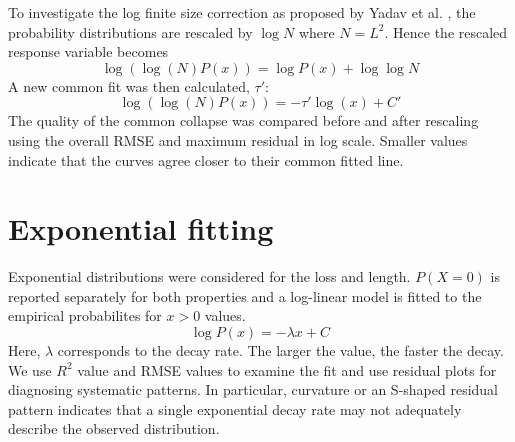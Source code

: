 To investigate the log finite size correction as proposed by Yadav et al.  \cite{Yadav2022FiniteSize}, the probability distributions are rescaled by $\log N$ where $N=L^2$. Hence the rescaled response variable becomes
\[
\log (\log (N)P(x))=\log P(x)+\log\log N
\]
A new common fit was then calculated, $\tau'$:
\[
 \log (\log (N)P(x))= -\tau' \log(x)+C'
\]
The quality of the common collapse was compared before and after
rescaling using the overall RMSE and maximum residual in log scale. Smaller values indicate that the curves agree closer to their common fitted line.

\section{Exponential fitting}\label{sec:exponential}

Exponential distributions were considered for the loss and length. $P(X=0)$ is reported separately for both properties and a log-linear model is fitted to the empirical probabilites for $x>0$ values.
\[
\log P(x) = -\lambda x +C
\]
Here, $\lambda$ corresponds to the decay rate. The larger the value, the faster the decay.\\

We use $R^2$ value and RMSE values to examine the fit and use residual plots for diagnosing systematic patterns. In particular, curvature or an S-shaped residual pattern indicates that a single exponential decay rate may not adequately describe the observed distribution.
